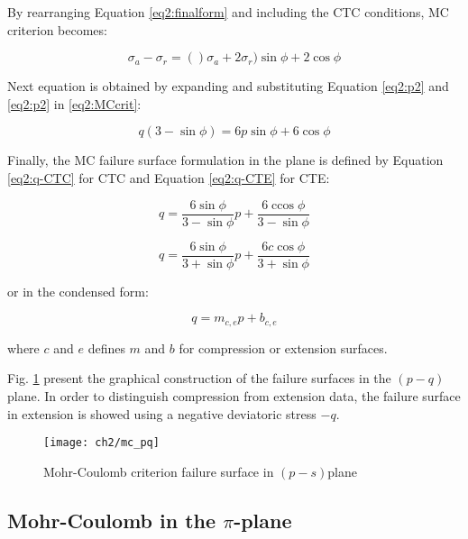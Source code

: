 By rearranging Equation \ref{eq2:finalform} and including the CTC conditions, MC criterion becomes:

\begin{equation}\label{eq2:MCcrit}
    \sigma_a - \sigma_r = ()\sigma_a+2\sigma_r)\sin \phi + 2 \cos \phi
\end{equation}

Next equation is obtained by expanding and substituting Equation \ref{eq2:p2} and \ref{eq2:p2} in \ref{eq2:MCcrit}: 

\begin{equation}
    q(3-\sin \phi) = 6p \sin \phi + 6 \cos \phi
\end{equation}

Finally, the MC failure surface formulation in the  plane is defined by Equation \ref{eq2:q-CTC} for CTC and Equation \ref{eq2:q-CTE} for CTE:

\begin{equation}\label{eq2:q-CTC}
    q=\frac{6 \sin \phi}{3-\sin \phi} p+\frac{6 \operatorname{ccos} \phi}{3-\sin \phi} 
\end{equation}

\begin{equation}\label{eq2:q-CTE}
    q=\frac{6 \sin \phi}{3+\sin \phi} p+\frac{6 c \cos \phi}{3+\sin \phi}
\end{equation}

or in the condensed form: 

\begin{equation}
    q = m_{c,e} p + b_{c,e}
\end{equation}

where $c$ and $e$  defines $m$ and $b$ for compression or extension surfaces. 

Fig. \ref{fig2:mc_pq} present the graphical construction of the failure surfaces in the  $(p-q)$plane. In order to distinguish compression from extension data, the failure surface in extension is showed using a negative deviatoric stress $-q$. 


\begin{figure}[tb]
    \centering
    \texttt{[image: ch2/mc\_pq]}
    \caption{Mohr-Coulomb criterion failure surface in  $(p-s)$plane}
    \label{fig2:mc_pq}
\end{figure} 

\subsection{Mohr-Coulomb in the \texorpdfstring{$\pi$}{pi}-plane}


